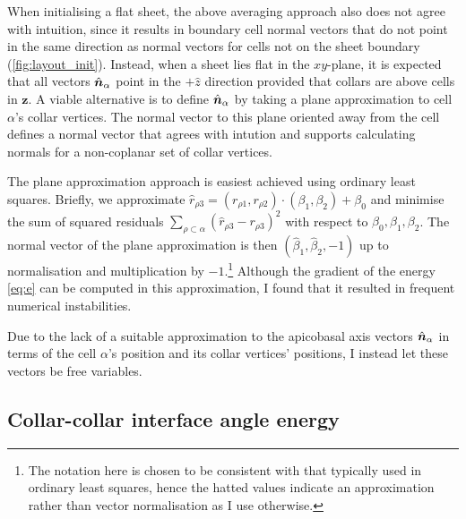 When initialising a flat sheet, the above averaging approach also does not agree with intuition, since it results in boundary cell normal vectors that do not point in the same direction as normal vectors for cells not on the sheet boundary (\cref{fig:layout_init}). Instead, when a sheet lies flat in the $xy$-plane, it is expected that all vectors $\hat{\bm{n}}_\alpha$ point in the $+\hat{z}$ direction provided that collars are above cells in $\bm{z}$. 
A viable alternative is to define $\hat{\bm{n}}_\alpha$ by taking a plane approximation to cell $\alpha$'s collar vertices. 
The normal vector to this plane oriented away from the cell defines a normal vector that agrees with intution and supports calculating normals for a non-coplanar set of collar vertices.

The plane approximation approach is easiest achieved using ordinary least squares. 
Briefly, we approximate $\hat{r}_{\rho 3} = (r_{\rho 1}, r_{\rho 2}) \cdot (\beta_1, \beta_2) + \beta_0$ and minimise the sum of squared residuals $\sum_{\rho\subset\alpha} (\hat{r}_{\rho 3} - r_{\rho 3})^2$ with respect to $\beta_0, \beta_1, \beta_2$. 
The normal vector of the plane approximation is then $(\hat{\beta}_1, \hat{\beta}_2, -1)$ up to normalisation and multiplication by $-1$.\footnote{The notation here is chosen to be consistent with that typically used in ordinary least squares, hence the hatted values indicate an approximation rather than vector normalisation as I use otherwise.} 
Although the gradient of the energy \cref{eq:e} can be computed in this approximation, I found that it resulted in frequent numerical instabilities.

Due to the lack of a suitable approximation to the apicobasal axis vectors $\hat{\bm{n}}_\alpha$ in terms of the cell $\alpha$'s position and its collar vertices' positions, I instead let these vectors be free variables.

\subsection{Collar-collar interface angle energy} \label{subsec:e_psi}

